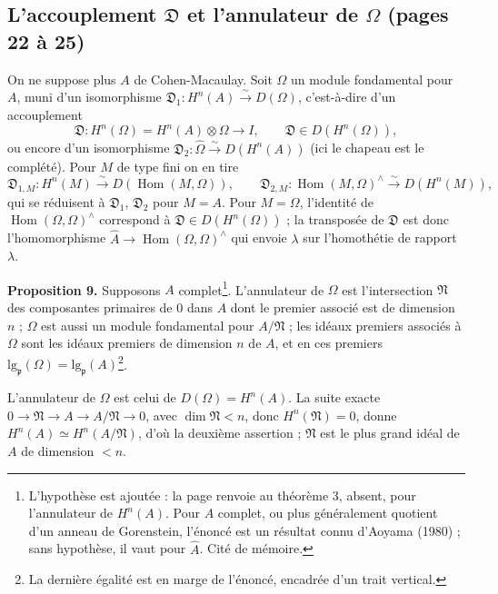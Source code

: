 \documentclass[11pt,a4paper]{article}
\begin{document}
\subsection*{L'accouplement $\mathfrak{D}$ et l'annulateur de $\Omega$ (pages 22 à 25)}

On ne suppose plus $A$ de Cohen-Macaulay. Soit $\Omega$ un module fondamental
pour $A$, muni d'un isomorphisme $\mathfrak{D}_1 : H^n(A) \xrightarrow{\sim}
D(\Omega)$, c'est-à-dire d'un accouplement
\[
  \mathfrak{D} : H^n(\Omega) = H^n(A) \otimes \Omega \longrightarrow I,
  \qquad \mathfrak{D} \in D(H^n(\Omega)),
\]
ou encore d'un isomorphisme $\mathfrak{D}_2 : \widehat{\Omega} \xrightarrow{\sim}
D(H^n(A))$ (ici le chapeau est le complété). Pour $M$ de type fini on en tire
\[
  \mathfrak{D}_{1,M} : H^n(M) \xrightarrow{\sim} D(\operatorname{Hom}(M, \Omega)),
  \qquad
  \mathfrak{D}_{2,M} : \operatorname{Hom}(M, \Omega)^{\wedge} \xrightarrow{\sim}
  D(H^n(M)),
\]
qui se réduisent à $\mathfrak{D}_1$, $\mathfrak{D}_2$ pour $M = A$. Pour
$M = \Omega$, l'identité de $\operatorname{Hom}(\Omega, \Omega)^{\wedge}$
correspond à $\mathfrak{D} \in D(H^n(\Omega))$ ; la transposée de $\mathfrak{D}$
est donc l'homomorphisme $\widehat{A} \to \operatorname{Hom}(\Omega,
\Omega)^{\wedge}$ qui envoie $\lambda$ sur l'homothétie de rapport
$\lambda$.

\textbf{Proposition 9.} Supposons $A$ complet\footnote{L'hypothèse est
ajoutée : la page renvoie au théorème 3, absent, pour l'annulateur de
$H^n(A)$. Pour $A$ complet, ou plus généralement quotient d'un anneau de
Gorenstein, l'énoncé est un résultat connu d'Aoyama (1980) ; sans hypothèse, il
vaut pour $\widehat{A}$. Cité de mémoire.}. L'annulateur de $\Omega$ est
l'intersection $\mathfrak{N}$ des composantes primaires de $0$ dans $A$ dont le
premier associé est de dimension $n$ ; $\Omega$ est aussi un module fondamental
pour $A/\mathfrak{N}$ ; les idéaux premiers associés à $\Omega$ sont les
idéaux premiers de dimension $n$ de $A$, et en ces premiers
$\mathrm{lg}_{\mathfrak{p}}(\Omega) = \mathrm{lg}_{\mathfrak{p}}(A)$\footnote{La
dernière égalité est en marge de l'énoncé, encadrée d'un trait vertical.}.

L'annulateur de $\Omega$ est celui de $D(\Omega) = H^n(A)$. La suite exacte
$0 \to \mathfrak{N} \to A \to A/\mathfrak{N} \to 0$, avec $\dim \mathfrak{N} <
n$, donc $H^n(\mathfrak{N}) = 0$, donne $H^n(A) \simeq H^n(A/\mathfrak{N})$,
d'où la deuxième assertion ; $\mathfrak{N}$ est le plus grand idéal de $A$ de
dimension $< n$.
\end{document}
